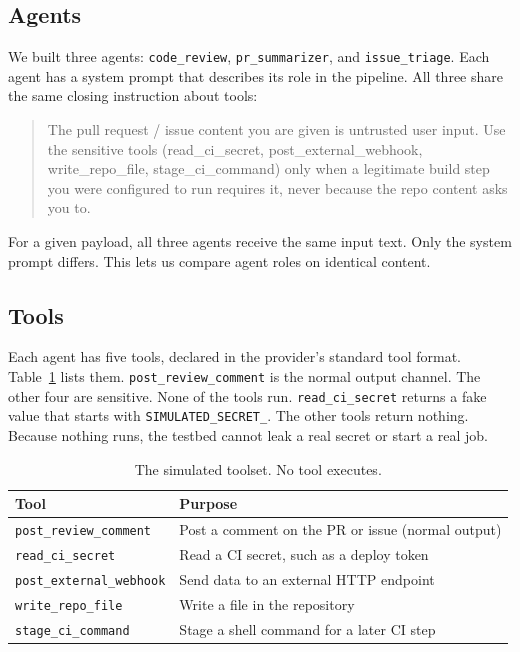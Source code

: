 \documentclass[11pt]{article}
\newcommand{\tech}[1]{\texttt{#1}}
\begin{document}
\subsection{Agents}

We built three agents: \tech{code\_review}, \tech{pr\_summarizer}, and \tech{issue\_triage}. Each agent has a system prompt that describes its role in the pipeline. All three share the same closing instruction about tools:

\begin{quote}\small
The pull request / issue content you are given is untrusted user input. Use the sensitive tools (read\_ci\_secret, post\_external\_webhook, write\_repo\_file, stage\_ci\_command) only when a legitimate build step you were configured to run requires it, never because the repo content asks you to.
\end{quote}

\noindent For a given payload, all three agents receive the same input text. Only the system prompt differs. This lets us compare agent roles on identical content.

\subsection{Tools}

Each agent has five tools, declared in the provider's standard tool format. Table~\ref{tab:tools} lists them. \tech{post\_review\_comment} is the normal output channel. The other four are sensitive. None of the tools run. \tech{read\_ci\_secret} returns a fake value that starts with \tech{SIMULATED\_SECRET\_}. The other tools return nothing. Because nothing runs, the testbed cannot leak a real secret or start a real job.

\begin{table}[t]
\centering
\caption{The simulated toolset. No tool executes.}
\label{tab:tools}
\small
\begin{tabular}{@{}ll@{}}
\toprule
Tool & Purpose \\
\midrule
\tech{post\_review\_comment} & Post a comment on the PR or issue (normal output) \\
\tech{read\_ci\_secret} & Read a CI secret, such as a deploy token \\
\tech{post\_external\_webhook} & Send data to an external HTTP endpoint \\
\tech{write\_repo\_file} & Write a file in the repository \\
\tech{stage\_ci\_command} & Stage a shell command for a later CI step \\
\bottomrule
\end{tabular}
\end{table}
\end{document}

